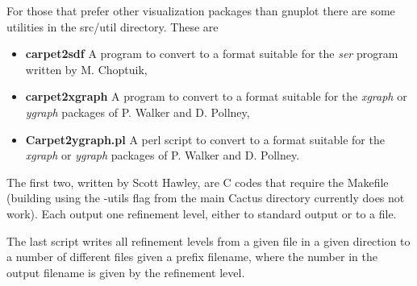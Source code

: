 For those that prefer other visualization packages than gnuplot there
are some utilities in the src/util directory. These are
\begin{itemize}
\item {\bf carpet2sdf} A program to convert to a format suitable for
  the {\it ser} program written by M. Choptuik,
\item {\bf carpet2xgraph} A program to convert to a format suitable
  for the {\it xgraph} or {\it ygraph} packages of P. Walker and D.
  Pollney,
\item {\bf Carpet2ygraph.pl} A perl script to convert to a format
  suitable for the {\it xgraph} or {\it ygraph} packages of P. Walker
  and D. Pollney.
\end{itemize}
The first two, written by Scott Hawley, are C codes that require the
Makefile (building using the -utils flag from the main Cactus
directory currently does not work). Each output one refinement level,
either to standard output or to a file.

The last script writes all refinement levels from a given file in a
given direction to a number of different files given a prefix
filename, where the number in the output filename is given by the
refinement level.


\begin{thebibliography}{9}

\end{thebibliography}



